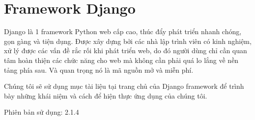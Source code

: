\section{Framework Django}
Django là 1 framework Python web cấp cao, thúc đẩy phát triển nhanh chóng, gọn gàng và tiện dụng. Được xây dựng bởi các nhà lập trình viên có kinh nghiệm, xử lý được các vấn đề rắc rối khi phát triển web, do đó người dùng chỉ cần quan tâm hoàn thiện các chức năng cho web mà không cần phải quá lo lắng về nền tảng phía sau. Và quan trọng nó là mã nguồn mở và miễn phí.
\\\par
Chúng tôi sẽ sử dụng mục tài liệu\cite{django} tại trang chủ của Django framework để trình bày những khái niệm và cách để hiện thực ứng dụng của chúng tôi.
\\\par
Phiên bản sử dụng: 2.1.4
